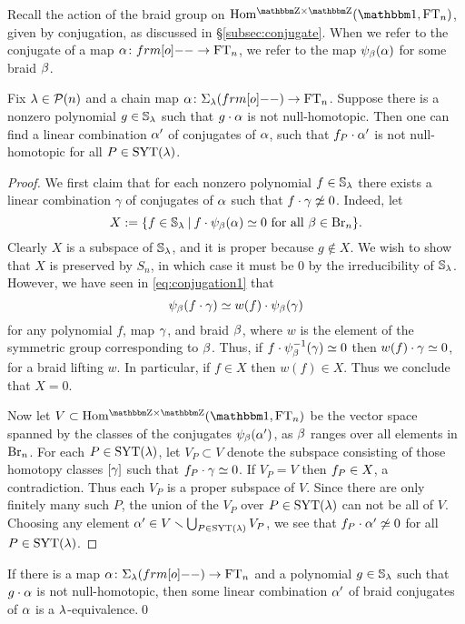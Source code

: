 Recall the action of the braid group on $\Homgg(\one, \FT_n)$, given by conjugation, as discussed in \S\ref{subsec:conjugate}.  When we refer to the conjugate of a map $\a \co \one \to \FT_n$, we refer to the map $\psi_\beta(\alpha)$ for some braid $\beta$.

\begin{lemma}\label{lem:criterion} Fix $\lambda \in {\mathcal{P}}(n)$ and a chain map $\a\co\shift{\l}{\one}\to \FT_n$. Suppose there is a nonzero polynomial $g \in {\mathbb{S}}_\lambda$ such that $g \cdot \alpha$ is not null-homotopic. Then one can find a linear combination $\alpha'$ of conjugates of $\alpha$, such that $f_{P} \cdot \alpha'$ is not null-homotopic for all $P \in \operatorname{SYT}(\lambda)$. \end{lemma}
	
\begin{proof} We first claim that for each nonzero polynomial $f \in {\mathbb{S}}_\lambda$ there exists a linear combination $\gamma$ of conjugates of $\alpha$ such that $f\cdot \gamma\not\simeq 0$. Indeed, let
\[
X := \{f \in {\mathbb{S}}_\lambda \:|\: f\cdot \psi_\beta(\alpha) \simeq 0 \textrm{ for all } \beta\in \operatorname{Br}_n\}.
\]
Clearly $X$ is a subspace of ${\mathbb{S}}_\lambda$, and it is proper because $g \notin X$.  We wish to show that $X$ is preserved by $S_n$, in which case it must be $0$ by the irreducibility of ${\mathbb{S}}_\lambda$. However, we have seen in \eqref{eq:conjugation1} that
\[
\psi_\beta(f\cdot \gamma)\simeq w(f) \cdot \psi_\beta(\gamma)
\]
for any polynomial $f$, map $\gamma$, and braid $\beta$, where $w$ is the element of the symmetric group corresponding to $\beta$. Thus, if $f \cdot \psi_\beta^{-1} (\gamma) \simeq 0$ then $w(f) \cdot \gamma \simeq 0$, for a braid lifting $w$. In particular, if $f \in X$ then $w(f) \in X$. Thus we conclude that $X = 0$.

Now let $V\subset \Homgg(\one,\FT_n)$ be the vector space spanned by the classes of the conjugates $\psi_\beta(\alpha')$, as $\beta$ ranges over all elements in $\operatorname{Br}_n$. For each $P\in \operatorname{SYT}(\lambda)$, let
$V_P\subset V$ denote the subspace consisting of those homotopy classes $[\gamma]$ such that $f_{P}\cdot \gamma \simeq 0$. If $V_P = V$ then $f_{P} \in X$, a contradiction. Thus each $V_P$ is a proper subspace of $V$. Since there are only finitely many such $P$, the union of the $V_P$ over $P \in \operatorname{SYT}(\lambda)$ can not be all of $V$. Choosing any element $\alpha' \in V\smallsetminus
\bigcup_{P\in \operatorname{SYT}(\lambda)}V_P$, we see that $f_{P} \cdot \alpha' \not\simeq 0$ for all $P \in \operatorname{SYT}(\lambda)$. \end{proof}


\begin{cor} \label{cor:sufficientcondition} If there is a map $\a \co \shift{\l}{\one}\to \FT_n$ and a polynomial $g \in {\mathbb{S}}_\lambda$ such that $g \cdot \alpha$ is not null-homotopic, then some linear combination $\alpha'$ of braid conjugates of $\alpha$ is a $\lambda$-equivalence.\qed \end{cor}

